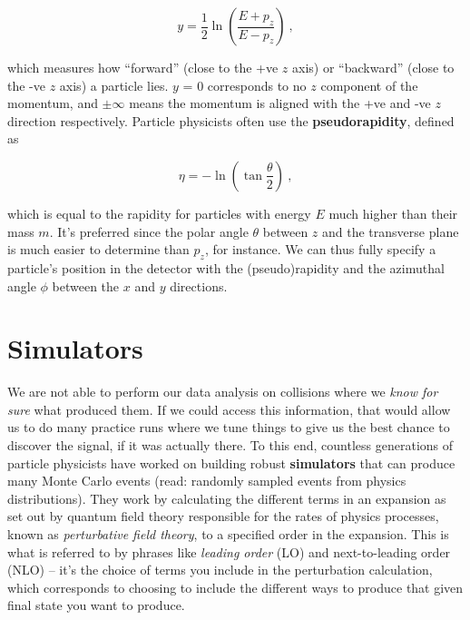 \documentclass[
  11pt,
  numbers=noendperiod]{book}
\begin{document}
\[
y = \frac{1}{2}\ln{\left(\frac{E+p_z}{E-p_z}\right)}~,
\]

which measures how ``forward'' (close to the +ve \(z\) axis) or
``backward'' (close to the -ve \(z\) axis) a particle lies. \(y\) = 0
corresponds to no \(z\) component of the momentum, and \(\pm \infty\)
means the momentum is aligned with the +ve and -ve \(z\) direction
respectively. Particle physicists often use the \textbf{pseudorapidity},
defined as

\[
\eta = -\ln{\left(\tan{\frac{\theta}{2}}\right)}~,
\]

which is equal to the rapidity for particles with energy \(E\) much
higher than their mass \(m\). It's preferred since the polar angle
\(\theta\) between \(z\) and the transverse plane is much easier to
determine than \(p_z\), for instance. We can thus fully specify a
particle's position in the detector with the (pseudo)rapidity and the
azimuthal angle \(\phi\) between the \(x\) and \(y\) directions.

\hypertarget{simulators}{%
\section{Simulators}\label{simulators}}

We are not able to perform our data analysis on collisions where we
\emph{know for sure} what produced them. If we could access this
information, that would allow us to do many practice runs where we tune
things to give us the best chance to discover the signal, if it was
actually there. To this end, countless generations of particle
physicists have worked on building robust \textbf{simulators} that can
produce many Monte Carlo events (read: randomly sampled events from
physics distributions). They work by calculating the different terms in
an expansion as set out by quantum field theory responsible for the
rates of physics processes, known as \emph{perturbative field theory},
to a specified order in the expansion. This is what is referred to by
phrases like \emph{leading order} (LO) and next-to-leading order (NLO)
-- it's the choice of terms you include in the perturbation calculation,
which corresponds to choosing to include the different ways to produce
that given final state you want to produce.
\end{document}
